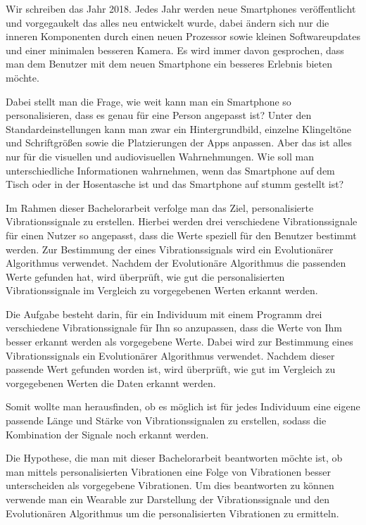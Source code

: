 
Wir schreiben das Jahr 2018. 
Jedes Jahr werden neue Smartphones veröffentlicht und vorgegaukelt das alles neu entwickelt wurde, dabei ändern sich nur die inneren Komponenten durch einen neuen Prozessor sowie kleinen Softwareupdates und einer minimalen besseren Kamera. 
Es wird immer davon gesprochen, dass man dem Benutzer mit dem neuen Smartphone ein besseres Erlebnis bieten möchte. 

Dabei stellt man die Frage, wie weit kann man ein Smartphone so personalisieren, dass es genau für eine Person angepasst ist? 
Unter den Standardeinstellungen kann man zwar ein Hintergrundbild, einzelne Klingeltöne und Schriftgrößen sowie die Platzierungen der Apps anpassen. 
Aber das ist alles nur für die visuellen und audiovisuellen Wahrnehmungen. 
Wie soll man unterschiedliche Informationen wahrnehmen, wenn das Smartphone auf dem Tisch oder in der Hosentasche ist und das Smartphone auf stumm gestellt ist? 

Im Rahmen dieser Bachelorarbeit verfolge man das Ziel, personalisierte Vibrationssignale zu erstellen.
Hierbei werden drei verschiedene Vibrationssignale f{\"u}r einen Nutzer so angepasst, dass die Werte speziell f{\"u}r den Benutzer bestimmt werden. 
Zur Bestimmung der eines Vibrationssignals wird ein Evolution{\"a}rer Algorithmus verwendet. Nachdem der Evolution{\"a}re Algorithmus die passenden Werte gefunden hat, wird {\"u}berpr{\"u}ft, wie gut die personalisierten Vibrationssignale im Vergleich zu vorgegebenen Werten erkannt werden. 

Die Aufgabe besteht darin, f{\"u}r ein Individuum mit einem Programm drei verschiedene Vibrationssignale f{\"u}r Ihn so anzupassen, dass die Werte von Ihm besser erkannt werden als vorgegebene Werte. Dabei wird zur Bestimmung eines Vibrationssignals ein Evolution{\"a}rer Algorithmus verwendet. Nachdem dieser passende Wert gefunden worden ist, wird {\"u}berpr{\"u}ft, wie gut im Vergleich zu vorgegebenen Werten die Daten erkannt werden.

Somit wollte man herausfinden, ob es m{\"o}glich ist f{\"u}r jedes Individuum eine eigene passende L{\"a}nge und St{\"a}rke von Vibrationssignalen zu erstellen, sodass die Kombination der Signale noch erkannt werden.

Die Hypothese, die man mit dieser Bachelorarbeit beantworten m{\"o}chte ist, ob man mittels personalisierten Vibrationen eine Folge von Vibrationen besser unterscheiden als vorgegebene Vibrationen.
Um dies beantworten zu k{\"o}nnen verwende man ein Wearable zur Darstellung der Vibrationssignale und den Evolutionären Algorithmus um die personalisierten Vibrationen zu ermitteln.

